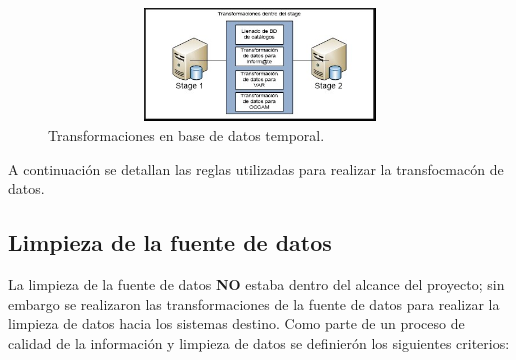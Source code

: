 \documentclass[a4paper,openright,12pt]{book}
\begin{document}
\begin{figure}[htb]
  \begin{center}
    \includegraphics[width=12cm, height=3cm, scale=0.5]{Transformaciones_stage.jpg}
    \caption{Transformaciones en base de datos temporal.}
    \label{fig:arquitectura}
  \end{center}
\end{figure}

A continuación se detallan las reglas utilizadas para realizar la transfocmacón
de datos.

\subsection{Limpieza de la fuente de datos}

La limpieza de la fuente de datos \textbf{NO} estaba dentro del alcance del
proyecto; sin embargo se realizaron las transformaciones de la fuente de datos
para realizar la limpieza de datos hacia los sistemas destino. Como parte de un
proceso de calidad de la información y limpieza de datos se definierón los
siguientes criterios:
\end{document}
